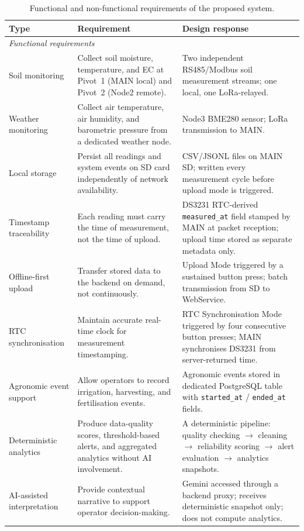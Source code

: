 \begin{table}[H]
\centering
\caption{Functional and non-functional requirements of the proposed system.}
\label{tab:system-requirements}
\small
\begin{tabular}{p{2.8cm} p{6.2cm} p{5.0cm}}
\hline
\textbf{Type} & \textbf{Requirement} & \textbf{Design response} \\
\hline
\multicolumn{3}{l}{\textit{Functional requirements}} \\
\hline
Soil monitoring & Collect soil moisture, temperature, and EC at Pivot~1 (MAIN local) and Pivot~2 (Node2 remote). & Two independent RS485/Modbus soil measurement streams; one local, one LoRa-relayed. \\
\hline
Weather monitoring & Collect air temperature, air humidity, and barometric pressure from a dedicated weather node. & Node3 BME280 sensor; LoRa transmission to MAIN. \\
\hline
Local storage & Persist all readings and system events on SD card independently of network availability. & CSV/JSONL files on MAIN SD; written every measurement cycle before upload mode is triggered. \\
\hline
Timestamp traceability & Each reading must carry the time of measurement, not the time of upload. & DS3231 RTC-derived \texttt{measured\_at} field stamped by MAIN at packet reception; upload time stored as separate metadata only. \\
\hline
Offline-first upload & Transfer stored data to the backend on demand, not continuously. & Upload Mode triggered by a sustained button press; batch transmission from SD to WebService. \\
\hline
RTC synchronisation & Maintain accurate real-time clock for measurement timestamping. & RTC Synchronisation Mode triggered by four consecutive button presses; MAIN synchronises DS3231 from server-returned time. \\
\hline
Agronomic event support & Allow operators to record irrigation, harvesting, and fertilisation events. & Agronomic events stored in dedicated PostgreSQL table with \texttt{started\_at} / \texttt{ended\_at} fields. \\
\hline
Deterministic analytics & Produce data-quality scores, threshold-based alerts, and aggregated analytics without AI involvement. & A deterministic pipeline: quality checking $\rightarrow$ cleaning $\rightarrow$ reliability scoring $\rightarrow$ alert evaluation $\rightarrow$ analytics snapshots. \\
\hline
AI-assisted interpretation & Provide contextual narrative to support operator decision-making. & Gemini accessed through a backend proxy; receives deterministic snapshot only; does not compute analytics. \\

\end{tabular}
\end{table}
